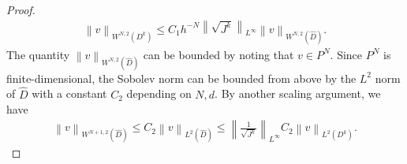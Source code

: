 \documentclass[preprint,10pt]{article}
\theoremstyle{definition}
\theoremstyle{lemma}
\theoremstyle{theorem}
\theoremstyle{assumption}
\renewcommand{\hat}{\widehat}
\newcommand{\nor}[1]{\left\| #1 \right\|}
\newcommand{\LRp}[1]{\left( #1 \right)}
\begin{document}
{\begin{proof}
\begin{align}
\nor{v}_{W^{N,2}\LRp{D^k}}  \leq C_1 h^{-N} \nor{\sqrt{J^k}}_{L^{\infty}} \nor{v}_{W^{N,2}\LRp{\hat{D}}}.  
\end{align}
The quantity $\nor{v}_{W^{N,2}\LRp{\hat{D}}}$ can be bounded by noting that $v\in P^N$.  Since $P^N$ is finite-dimensional, the Sobolev norm can be bounded from above by the $L^2$ norm of $\hat{D}$ with a constant $C_{2}$ depending on $N, d$.  By another scaling argument, we have 
\begin{align}
\nor{v}_{W^{N+1,2}\LRp{\hat{D}}} \leq C_{2} \nor{v}_{L^2\LRp{\hat{D}}} \leq \nor{\frac{1}{\sqrt{J^k}}}_{L^{\infty}} C_{2}  \nor{v}_{L^2\LRp{D^k}}.
\end{align}
\end{proof}

}
\end{document}
